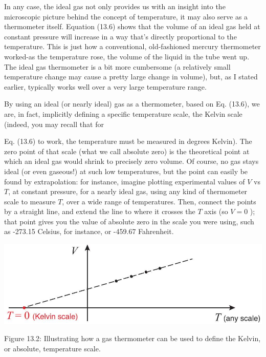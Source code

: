 \documentclass[10pt]{article}
\begin{document}
In any case, the ideal gas not only provides us with an insight into the microscopic picture behind the concept of temperature, it may also serve as a thermometer itself. Equation (13.6) shows that the volume of an ideal gas held at constant pressure will increase in a way that's directly proportional to the temperature. This is just how a conventional, old-fashioned mercury thermometer worked-as the temperature rose, the volume of the liquid in the tube went up. The ideal gas thermometer is a bit more cumbersome (a relatively small temperature change may cause a pretty large change in volume), but, as I stated earlier, typically works well over a very large temperature range.

By using an ideal (or nearly ideal) gas as a thermometer, based on Eq. (13.6), we are, in fact, implicitly defining a specific temperature scale, the Kelvin scale (indeed, you may recall that for

Eq. (13.6) to work, the temperature must be measured in degrees Kelvin). The zero point of that scale (what we call absolute zero) is the theoretical point at which an ideal gas would shrink to precisely zero volume. Of course, no gas stays ideal (or even gaseous!) at such low temperatures, but the point can easily be found by extrapolation: for instance, imagine plotting experimental values of $V$ vs $T$, at constant pressure, for a nearly ideal gas, using any kind of thermometer scale to measure $T$, over a wide range of temperatures. Then, connect the points by a straight line, and extend the line to where it crosses the $T$ axis (so $V=0$ ); that point gives you the value of absolute zero in the scale you were using, such as -273.15 Celsius, for instance, or -459.67 Fahrenheit.

\begin{center}
\includegraphics[max width=\textwidth]{2024_09_14_9969b06773f10b6936e8g-326}
\end{center}

Figure 13.2: Illustrating how a gas thermometer can be used to define the Kelvin, or absolute, temperature scale.
\end{document}
